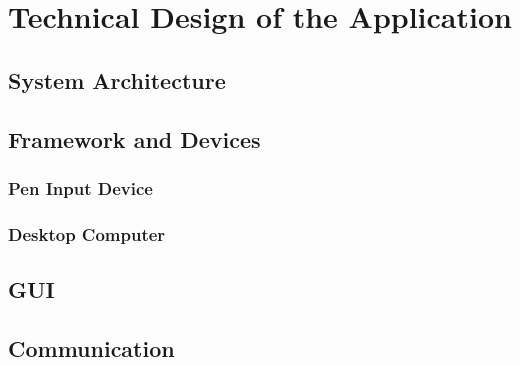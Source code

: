 
\chapter{Technical Design of the Application}
\label{chap:technicaldesign}

\section{System Architecture}
\label{sec:systemarchitecture}

\section{Framework and Devices}
\label{sec:frameworkanddevices}

\subsection{Pen Input Device}
\label{sec:peninputdevice}

\subsection{Desktop Computer}
\label{sec:desktopcomputer}

\section{GUI}
\label{sec:gui}

\section{Communication}
\label{sec:communication}


